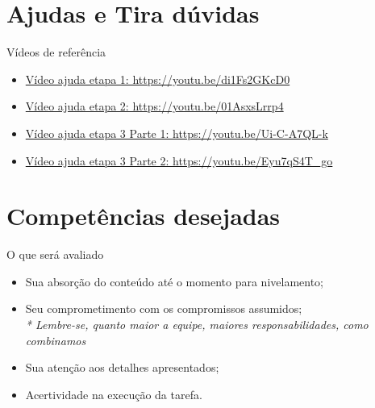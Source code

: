 \documentclass{beamer}
\newcommand{\hrefcol}[2]{\textcolor{cyan}{\href{#1}{#2}}}
\begin{document}
\section{Ajudas e Tira dúvidas}

\begin{frame}{Vídeos de referência}
      \begin{itemize}
            \item \hrefcol{https://youtu.be/di1Fs2GKcD0}{Vídeo ajuda etapa 1: https://youtu.be/di1Fs2GKcD0}
            \item \hrefcol{https://youtu.be/01AsxsLrrp4}{Vídeo ajuda etapa 2: https://youtu.be/01AsxsLrrp4}
            \item \hrefcol{https://youtu.be/Ui-C-A7QL-k}{Vídeo ajuda etapa 3 Parte 1: https://youtu.be/Ui-C-A7QL-k}
            \item \hrefcol{https://youtu.be/Eyu7qS4T_go}{Vídeo ajuda etapa 3 Parte 2: https://youtu.be/Eyu7qS4T\_go}
      \end{itemize}
\end{frame}
\section{Competências desejadas}
\begin{frame}[fragile]{O que será avaliado}
      \begin{itemize}
            \item Sua absorção do conteúdo até o momento para nivelamento;
            \item Seu comprometimento com os compromissos assumidos;
            \\ \textcolor{sintefdarkgreen}{ \textit{* Lembre-se, quanto maior a equipe, maiores responsabilidades, como combinamos}}
            \item Sua atenção aos detalhes apresentados;
            \item Acertividade na execução da tarefa.
      \end{itemize}
\end{frame}



\backmatter
\end{document}
